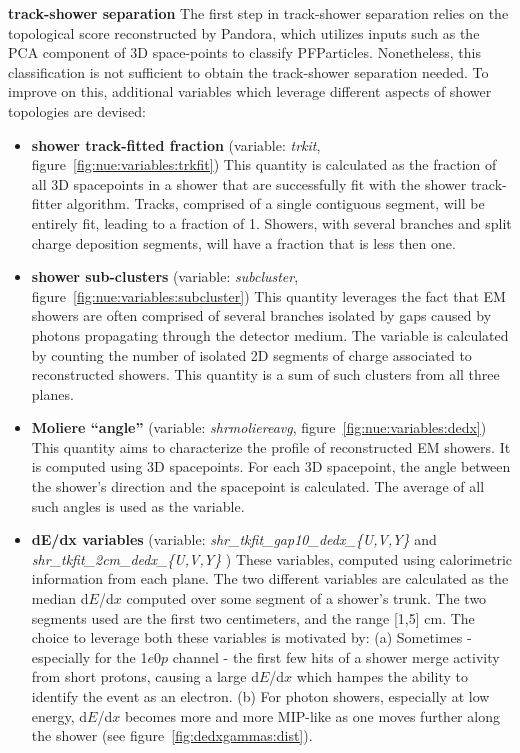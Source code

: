 \documentclass[a4paper]{article}
\begin{document}
\par \noindent \textbf{track-shower separation} The first step in track-shower separation relies on the topological score reconstructed by Pandora, which utilizes inputs such as the PCA component of 3D space-points to classify PFParticles. Nonetheless, this classification is not sufficient to obtain the track-shower separation needed. To improve on this, additional variables which leverage different aspects of shower topologies are devised:

\begin{itemize}
    \item \textbf{shower track-fitted fraction} (variable: \emph{trkit}, figure~\ref{fig:nue:variables:trkfit}) This quantity is calculated as the fraction of all 3D spacepoints in a shower that are successfully fit with the shower track-fitter algorithm. Tracks, comprised of a single contiguous segment, will be entirely fit, leading to a fraction of 1. Showers, with several branches and split charge deposition segments, will have a fraction that is less then one.
    \item \textbf{shower sub-clusters} (variable: \emph{subcluster}, figure~\ref{fig:nue:variables:subcluster}) This quantity leverages the fact that EM showers are often comprised of several branches isolated by gaps caused by photons propagating through the detector medium. The variable is calculated by counting the number of isolated 2D segments of charge associated to reconstructed showers. This quantity is a sum of such clusters from all three planes.
    \item \textbf{Moliere ``angle''} (variable: \emph{shrmoliereavg}, figure~\ref{fig:nue:variables:dedx}) This quantity aims to characterize the profile of reconstructed EM showers. It is computed using 3D spacepoints. For each 3D spacepoint, the angle between the shower's direction and the spacepoint is calculated. The average of all such angles is used as the variable.
    \item \textbf{dE/dx variables} (variable: \emph{shr\_tkfit\_gap10\_dedx\_\{U,V,Y\}} and \emph{shr\_tkfit\_2cm\_dedx\_\{U,V,Y\}} )  These variables, computed using calorimetric information from each plane. The two different variables are calculated as the median d$E$/d$x$ computed over some segment of a shower's trunk. The two segments used are the first two centimeters, and the range [1,5] cm. The choice to leverage both these variables  is motivated by: (a) Sometimes - especially for the 1$e$0$p$ channel - the first few hits of a shower merge activity from short protons, causing a large d$E$/d$x$ which hampes the ability to identify the event as an electron. (b) For photon showers, especially at low energy, d$E$/d$x$ becomes more and more MIP-like as one moves further along the shower (see figure~\ref{fig:dedxgammas:dist}).
\end{itemize}{}
\end{document}
